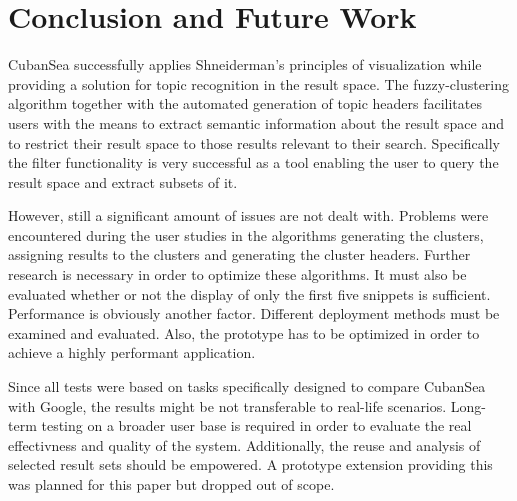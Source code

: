 \section{Conclusion and Future Work}
CubanSea successfully applies Shneiderman's principles of visualization while providing a solution for topic recognition in the result space. The fuzzy-clustering algorithm together with the automated generation of topic headers facilitates users with the means to extract semantic information about the result space and to restrict their result space to those results relevant to their search. Specifically the filter functionality is very successful as a tool enabling the user to query the result space and extract subsets of it.

However, still a significant amount of issues are not dealt with. Problems were encountered during the user studies in the algorithms generating the clusters, assigning results to the clusters and generating the cluster headers. Further research is necessary in order to optimize these algorithms. It must also be evaluated whether or not the display of only the first five snippets is sufficient. Performance is obviously another factor. Different deployment methods must be examined and evaluated. Also, the prototype has to be optimized in order to achieve a highly performant application.

Since all tests were based on tasks specifically designed to compare CubanSea with Google, the results might be not transferable to real-life scenarios. Long-term testing on a broader user base is required in order to evaluate the real effectivness and quality of the system. Additionally, the reuse and analysis of selected result sets should be empowered. A prototype extension providing this was planned for this paper but dropped out of scope.
